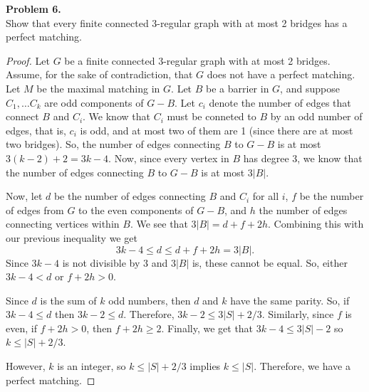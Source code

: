 \documentclass{article}
\newcommand{\size}[1]{|#1|}
\newenvironment{hwproof}[2]
{
    \textbf{Problem #1.}\\
    #2
    \begin{proof}
}{
    \end{proof}
}
\begin{document}
\begin{hwproof}
    {6}
    {Show that every finite connected 3-regular graph with at most 2 bridges has a perfect matching.}

    Let $G$ be a finite connected 3-regular graph with at most 2 bridges. Assume, for the sake of contradiction, that $G$ does not have a perfect matching.
    Let $M$ be the maximal matching in $G$. Let $B$ be a barrier in $G$, and suppose $C_1,\dots C_k$ are odd components of $G - B$. Let $c_i$ denote the number of
    edges that connect $B$ and $C_i$. We know that $C_i$ must be conneted to $B$ by an odd number of edges, that is, $c_i$ is odd, and at most
    two of them are 1 (since there are at most two bridges). So, the number of edges connecting $B$ to $G - B$ is at most $3(k - 2) + 2 = 3k - 4$. Now, since every
    vertex in $B$ has degree 3, we know that the number of edges connecting $B$ to $G - B$ is at most $3\size{B}$.

    Now, let $d$ be the number of edges connecting $B$ and $C_i$ for all $i$, $f$ be the number of edges from $G$ to the even components of $G - B$, and $h$ the
    number of edges connecting vertices within $B$. We see that $3\size{B} = d + f + 2h$. Combining this with our previous inequality we get
    \begin{equation*}
        3k - 4 \leq d \leq  d + f + 2h = 3\size{B}.
    \end{equation*}
    Since $3k - 4$ is not divisible by 3 and $3\size{B}$ is, these cannot be equal.
    So, either $3k - 4 < d$ or $f + 2h > 0$.

    Since $d$ is the sum of $k$ odd numbers, then $d$ and $k$ have the same parity.
    So, if $3k - 4 \leq d$ then $3k - 2 \leq d$. Therefore, $3k - 2 \leq 3\size{S} + 2/3$.
    Similarly, since $f$ is even, if $f + 2h > 0$, then $f + 2h \geq 2$. Finally, we
    get that $3k - 4 \leq 3\size{S} - 2$ so $k \leq \size{S} + 2/3$.

    However, $k$ is an integer, so $k \leq \size{S} + 2/3$ implies $k \leq \size{S}$. Therefore, we have a perfect matching.
\end{hwproof}
\end{document}
